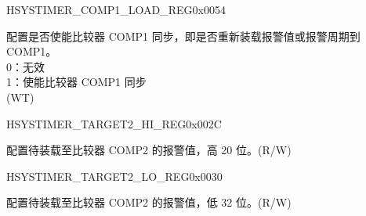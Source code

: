 \begin{register}{H}{SYSTIMER\_COMP1\_LOAD\_REG}{0x0054}\label{regdesc:SYSTIMERCOMP1LOADREG}
%
%
\regnewline%
\begin{regdesc}\begin{reglist}
\label{fielddesc:SYSTIMERTIMERCOMP1LOAD}\item [SYSTIMER\_TIMER\_COMP1\_LOAD] 配置是否使能比较器 COMP1 同步，即是否重新装载报警值或报警周期到 COMP1。\\
0：无效 \\
1：使能比较器 COMP1 同步\\
(WT)
\end{reglist}\end{regdesc}
\end{register}


\begin{register}{H}{SYSTIMER\_TARGET2\_HI\_REG}{0x002C}\label{regdesc:SYSTIMERTARGET2HIREG}
%
%
\regnewline%
\begin{regdesc}\begin{reglist}
\label{fielddesc:SYSTIMERTIMERTARGET2HI}\item [SYSTIMER\_TIMER\_TARGET2\_HI] 配置待装载至比较器 COMP2 的报警值，高 20 位。(R/W)
\end{reglist}\end{regdesc}
\end{register}


\begin{register}{H}{SYSTIMER\_TARGET2\_LO\_REG}{0x0030}\label{regdesc:SYSTIMERTARGET2LOREG}
%
\regnewline%
\begin{regdesc}\begin{reglist}
\label{fielddesc:SYSTIMERTIMERTARGET2LO}\item [SYSTIMER\_TIMER\_TARGET2\_LO] 配置待装载至比较器 COMP2 的报警值，低 32 位。(R/W)
\end{reglist}\end{regdesc}
\end{register}


